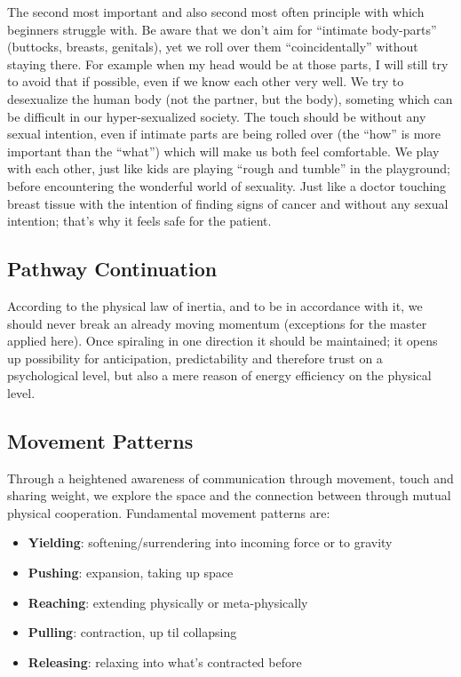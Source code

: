 The second most important and also second most often principle with which beginners struggle with.
Be aware that we don't aim for ``intimate body-parts'' (buttocks, breasts, genitals), yet we roll over them ``coincidentally'' without staying there.
For example when my head would be at those parts, I will still try to avoid that if possible, even if we know each other very well.
We try to desexualize the human body (not the partner, but the body), someting which can be difficult in our hyper-sexualized society.
The touch should be without any sexual intention, even if intimate parts are being rolled over (the ``how'' is more important than the ``what'') which will make us both feel comfortable.
We play with each other, just like kids are playing ``rough and tumble'' in the playground;
before encountering the wonderful world of sexuality.
Just like a doctor touching breast tissue with the intention of finding signs of cancer and without any sexual intention;
that's why it feels safe for the patient.

\subsection{Pathway Continuation}\label{subsec:pathway-continuation}

According to the physical law of inertia, and to be in accordance with it, we should never break an already moving momentum (exceptions for the master applied here).
Once spiraling in one direction it should be maintained; it opens up possibility for anticipation, predictability and therefore trust on a psychological level, but also a mere reason of energy efficiency on the physical level.

\subsection{Movement Patterns}\label{subsec:movement-patterns}

Through a heightened awareness of communication through movement, touch and sharing weight, we explore the space and the connection between through mutual physical cooperation.
Fundamental movement patterns are:

\begin{itemize}
    \item \textbf{Yielding}: softening/surrendering into incoming force or to gravity
    \item \textbf{Pushing}: expansion, taking up space
    \item \textbf{Reaching}: extending physically or meta-physically
    \item \textbf{Pulling}: contraction, up til collapsing
    \item \textbf{Releasing}: relaxing into what's contracted before
\end{itemize}

